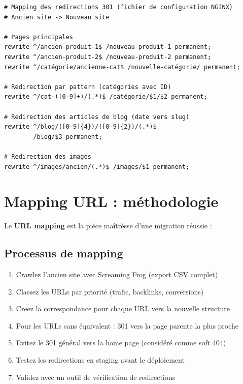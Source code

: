 \documentclass[12pt,a4paper,twoside]{report}
\newcommand{\keyword}[1]{\textbf{\textcolor{googleblue}{#1}}}
\begin{document}
\begin{lstlisting}[style=code,caption={Fichier de redirection NGINX pour migration massive}]
# Mapping des redirections 301 (fichier de configuration NGINX)
# Ancien site -> Nouveau site

# Pages principales
rewrite ^/ancien-produit-1$ /nouveau-produit-1 permanent;
rewrite ^/ancien-produit-2$ /nouveau-produit-2 permanent;
rewrite ^/catégorie/ancienne-cat$ /nouvelle-catégorie/ permanent;

# Redirection par pattern (catégories avec ID)
rewrite ^/cat-([0-9]+)/(.*)$ /catégorie/$1/$2 permanent;

# Redirection des articles de blog (date vers slug)
rewrite ^/blog/([0-9]{4})/([0-9]{2})/(.*)$
        /blog/$3 permanent;

# Redirection des images
rewrite ^/images/ancien/(.*)$ /images/$1 permanent;
\end{lstlisting}

\section{Mapping URL : méthodologie}

Le \keyword{URL mapping} est la pièce maîtrèsse d'une migration réussie :

\subsection{Processus de mapping}

\begin{enumerate}
    \item Crawlez l'ancien site avec Screaming Frog (export CSV complet)
    \item Classez les URLs par priorité (trafic, backlinks, conversions)
    \item Creez la correspondance pour chaque URL vers la nouvelle structure
    \item Pour les URLs sans équivalent : 301 vers la page parente la plus proche
    \item Evitez le 301 général vers la home page (considéré comme soft 404)
    \item Testez les redirections en staging avant le déploiement
    \item Validez avec un outil de vérification de redirections
\end{enumerate}
\end{document}
